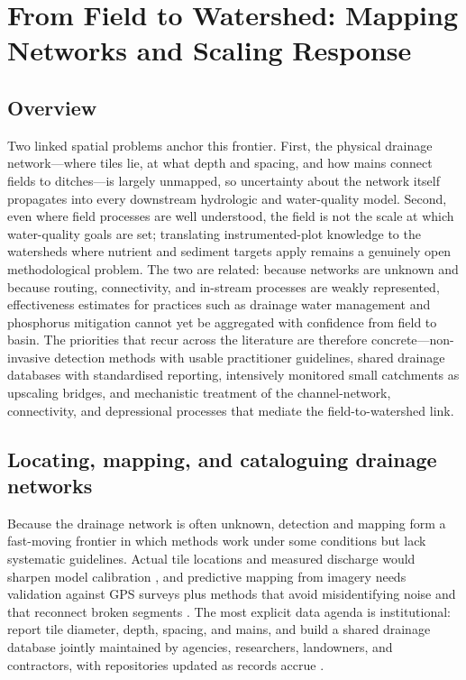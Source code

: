 \documentclass[11pt]{article}
\begin{document}
\section*{From Field to Watershed: Mapping Networks and Scaling Response}

\subsection{Overview}

Two linked spatial problems anchor this frontier. First, the physical drainage
network---where tiles lie, at what depth and spacing, and how mains connect
fields to ditches---is largely unmapped, so uncertainty about the network
itself propagates into every downstream hydrologic and water-quality model.
Second, even where field processes are well understood, the field is not the
scale at which water-quality goals are set; translating instrumented-plot
knowledge to the watersheds where nutrient and sediment targets apply remains a
genuinely open methodological problem. The two are related: because networks
are unknown and because routing, connectivity, and in-stream processes are
weakly represented, effectiveness estimates for practices such as drainage
water management and phosphorus mitigation cannot yet be aggregated with
confidence from field to basin. The priorities that recur across the literature
are therefore concrete---non-invasive detection methods with usable
practitioner guidelines, shared drainage databases with standardised reporting,
intensively monitored small catchments as upscaling bridges, and mechanistic
treatment of the channel-network, connectivity, and depressional processes that
mediate the field-to-watershed link.

\subsection{Locating, mapping, and cataloguing drainage networks}

Because the drainage network is often unknown, detection and mapping form a
fast-moving frontier in which methods work under some conditions but lack
systematic guidelines. Actual tile locations and measured discharge would
sharpen model calibration \parencite{Amado2018}, and predictive mapping from
imagery needs validation against GPS surveys plus methods that avoid
misidentifying noise and that reconnect broken segments
\parencite{Naz2009,Schilling2019}. The most explicit data agenda is
institutional: report tile diameter, depth, spacing, and mains, and build a
shared drainage database jointly maintained by agencies, researchers,
landowners, and contractors, with repositories updated as records accrue
\parencite{Zhou2025,Valayamkunnath2020}.
\end{document}
